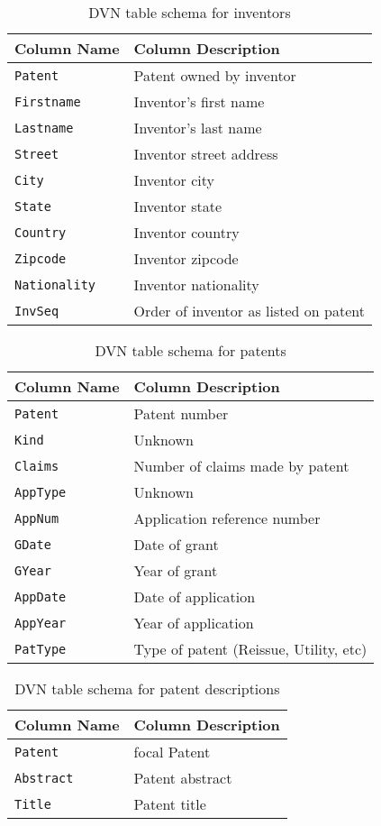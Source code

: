 \begin{table}[ht]
\center
\begin{tabular}{| l | l |}
\hline
Column Name & Column Description \\
\hline
\verb`Patent` & Patent owned by inventor \\
\verb`Firstname` & Inventor's first name \\
\verb`Lastname` & Inventor's last name \\
\verb`Street` & Inventor street address \\
\verb`City` & Inventor city \\
\verb`State` & Inventor state \\
\verb`Country` & Inventor country \\
\verb`Zipcode` & Inventor zipcode \\
\verb`Nationality` & Inventor nationality \\
\verb`InvSeq` & Order of inventor as listed on patent \\
\hline
\end{tabular}
\caption{DVN table schema for inventors}
\end{table}

\begin{table}[ht]
\center
\begin{tabular}{| l | l |}
\hline
Column Name & Column Description \\
\hline
\verb`Patent` & Patent number \\
\verb`Kind` & Unknown \\
\verb`Claims` & Number of claims made by patent \\
\verb`AppType` & Unknown \\
\verb`AppNum` & Application reference number \\
\verb`GDate` & Date of grant \\
\verb`GYear` & Year of grant \\
\verb`AppDate` & Date of application \\
\verb`AppYear` & Year of application \\
\verb`PatType` & Type of patent (Reissue, Utility, etc) \\
\hline
\end{tabular}
\caption{DVN table schema for patents}
\end{table}

\begin{table}[ht]
\center
\begin{tabular}{| l | l |}
\hline
Column Name & Column Description \\
\hline
\verb`Patent` & focal Patent \\
\verb`Abstract` & Patent abstract \\
\verb`Title` & Patent title \\
\hline
\end{tabular}
\caption{DVN table schema for patent descriptions}
\end{table}

